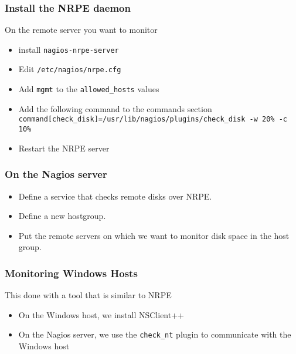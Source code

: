 \documentclass[10pt]{beamer}
\begin{document}
\begin{frame}
  \frametitle{Install the NRPE daemon}

On the remote server you want to monitor
\begin{itemize}
	\item install \texttt{nagios-nrpe-server}
  \item Edit \texttt{/etc/nagios/nrpe.cfg}
  \item Add \texttt{mgmt} to the \texttt{allowed\_hosts} values
  \item Add the following command to the commands section \\
   \texttt{command[check\_disk]=/usr/lib/nagios/plugins/check\_disk -w 20\% -c 10\%}

  \item Restart the NRPE server
\end{itemize}
\end{frame}

\begin{frame}
  \frametitle{On the Nagios server}

  \begin{itemize}
	  \item Define a service that checks remote disks over NRPE.
	  \item Define a new hostgroup.
	  \item Put the remote servers on which we want to monitor disk
		  space in the host group.
  \end{itemize}
\end{frame}
\begin{frame}
  \frametitle{Monitoring Windows Hosts}

This done with a tool that is similar to NRPE
\begin{itemize}
  \item On the Windows host, we install NSClient++
  \item On the Nagios server, we use the \texttt{check\_nt} plugin to communicate with
        the Windows host
\end{itemize}
\end{frame}
\end{document}

